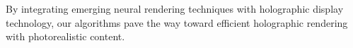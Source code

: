 By integrating emerging neural rendering techniques with holographic display technology, our algorithms pave the way toward efficient holographic rendering with photorealistic content.